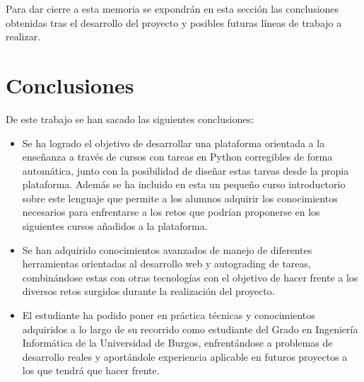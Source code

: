 
Para dar cierre a esta memoria se expondrán en esta sección las conclusiones obtenidas tras el desarrollo del proyecto y posibles futuras líneas de trabajo a realizar.

\section{Conclusiones}
De este trabajo se han sacado las siguientes conclusiones:

\begin{itemize}
\item Se ha logrado el objetivo de desarrollar una plataforma orientada a la enseñanza a través de cursos con tareas en Python corregibles de forma automática, junto con la posibilidad de diseñar estas tareas desde la propia plataforma. Además se ha incluido en esta un pequeño curso introductorio sobre este lenguaje que permite a los alumnos adquirir los conocimientos necesarios para enfrentarse a los retos que podrían proponerse en los siguientes cursos añadidos a la plataforma. 
\item Se han adquirido conocimientos avanzados de manejo de diferentes herramientas orientadas al desarrollo web y autograding de tareas, combinándose estas con otras tecnologías con el objetivo de hacer frente a los diversos retos surgidos durante la realización del proyecto. 
\item El estudiante ha podido poner en práctica técnicas y conocimientos adquiridos a lo largo de su recorrido como estudiante del Grado en Ingeniería Informática de la Universidad de Burgos, enfrentándose a problemas de desarrollo reales y aportándole experiencia aplicable en futuros proyectos a los que tendrá que hacer frente.
\end{itemize}

